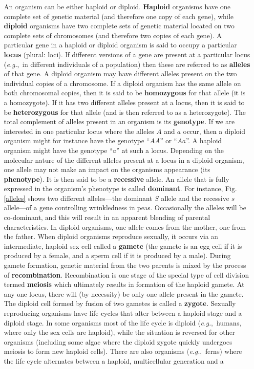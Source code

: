\documentclass[11pt,a4paper]{book}
\newcommand{\eg}{\emph{e.g.},\ }
\begin{document}
An organism can be either haploid or  diploid. {\bf  Haploid} organisms have one complete set of genetic material (and therefore one copy of each gene), while {\bf diploid} organisms have two  complete sets of genetic material located on two complete sets of chromosomes (and therefore two copies of each gene). A particular gene in a haploid or diploid organism is said to occupy a particular {\bf locus} (plural: loci). If different versions of a gene are present at a particular locus (\eg in different individuals of a population) then these are referred to as {\bf alleles} of that gene. A diploid organism may have different alleles present on the two individual copies of a chromosome. If a diploid organism has the same allele on both chromosomal copies, then it is said to be {\bf homozygous} for that allele (it is a homozygote). If it has two different alleles present at a locus, then it is said to be {\bf heterozygous} for that allele (and is then referred to as a heterozygote). The total complement of alleles present in an organism is its {\bf genotype}.  If we are interested in one particular locus where the alleles $A$ and $a$ occur, then a diploid organism might for instance have the genotype ``$AA$'' or ``$Aa$''. A haploid organism might have the genotype ``$a$'' at such a locus. Depending on the molecular nature of the different alleles present at a locus in a diploid organism, one allele may not make an impact on the organisms appearance (its {\bf phenotype}). It is then said to be a {\bf recessive} allele. An allele that is fully expressed in the organism's phenotype is called {\bf dominant}. For instance,  Fig. \ref{alleles} shows two different alleles---the dominant $S$ allele and the recessive $s$ allele---of a gene controlling wrinkledness in peas. Occasionally the alleles will be co-dominant, and this will result in an apparent blending of parental characteristics. In diploid organisms, one allele comes from the mother, one from the father. When diploid organisms reproduce sexually, it occurs via an intermediate, haploid sex cell called a  {\bf gamete} (the gamete is an egg cell if it is produced by a female, and a sperm cell if it is produced by a male). During gamete formation, genetic material from the two parents is mixed by the process of {\bf recombination}. Recombination is one stage of the special type of cell division termed {\bf meiosis} which ultimately results in formation of the haploid gamete. At any one locus, there will (by necessity) be only one allele present in the gamete. The diploid cell formed by fusion of two gametes is called a {\bf zygote}. Sexually reproducing organisms have life cycles that alter between a haploid stage and a diploid stage. In some organisms most of the life cycle is diploid (\eg humans, where only the sex cells are haploid), while the situation is reversed for other organisms (including some algae where the diploid zygote quickly undergoes meiosis to form new haploid cells). There are also organisms (\eg ferns) where the life cycle alternates between a haploid, multicellular generation and a 
\end{document}
